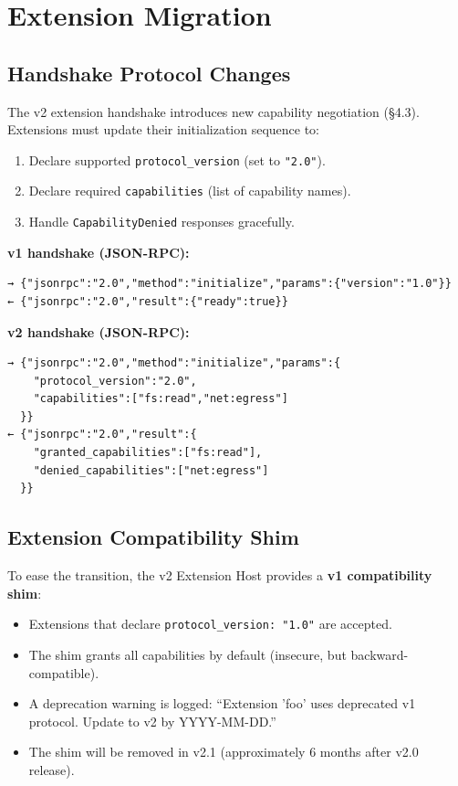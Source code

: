\section{Extension Migration}
\label{sec:extension-migration}

\subsection{Handshake Protocol Changes}

The v2 extension handshake introduces new capability negotiation (§4.3). Extensions must update their initialization sequence to:

\begin{enumerate}
  \item Declare supported \texttt{protocol\_version} (set to \texttt{"2.0"}).
  \item Declare required \texttt{capabilities} (list of capability names).
  \item Handle \texttt{CapabilityDenied} responses gracefully.
\end{enumerate}

\textbf{v1 handshake (JSON-RPC):}
\begin{verbatim}
→ {"jsonrpc":"2.0","method":"initialize","params":{"version":"1.0"}}
← {"jsonrpc":"2.0","result":{"ready":true}}
\end{verbatim}

\textbf{v2 handshake (JSON-RPC):}
\begin{verbatim}
→ {"jsonrpc":"2.0","method":"initialize","params":{
    "protocol_version":"2.0",
    "capabilities":["fs:read","net:egress"]
  }}
← {"jsonrpc":"2.0","result":{
    "granted_capabilities":["fs:read"],
    "denied_capabilities":["net:egress"]
  }}
\end{verbatim}

\subsection{Extension Compatibility Shim}

To ease the transition, the v2 Extension Host provides a \textbf{v1 compatibility shim}:

\begin{itemize}
  \item Extensions that declare \texttt{protocol\_version: "1.0"} are accepted.
  \item The shim grants all capabilities by default (insecure, but backward-compatible).
  \item A deprecation warning is logged: ``Extension 'foo' uses deprecated v1 protocol. Update to v2 by YYYY-MM-DD.''
  \item The shim will be removed in v2.1 (approximately 6 months after v2.0 release).
\end{itemize}

